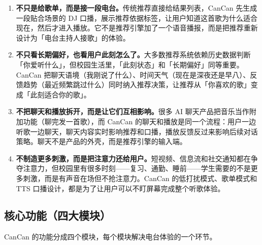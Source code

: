\documentclass[UTF8,a4paper,11pt,fontset=windows]{ctexart}
\begin{document}
\begin{enumerate}
  \item \textbf{不只是给歌单，而是接一段电台。}传统推荐直接给结果列表，CanCan 先生成一段贴合场景的 DJ 口播，展示推荐依据标签，让用户知道这首歌为什么适合现在，然后才进入播放。它不是推荐引擎加了一个语音播报，而是把推荐重新设计为「电台主持人接歌」的体验。
  \item \textbf{不只看长期偏好，也看用户此刻怎么了。}大多数推荐系统依赖历史数据判断「你爱听什么」，但校园生活里，「此刻状态」和「长期偏好」同等重要。CanCan 把聊天语境（我刚说了什么）、时间天气（现在是深夜还是早八）、反馈趋势（最近频繁跳过什么）同时纳入推荐决策，让推荐从「你喜欢的歌」变成「此刻适合你的歌」。
  \item \textbf{不把聊天和播放拆开，而是让它们互相影响。}很多 AI 聊天产品把音乐当作附加功能（聊完发一首歌），而 CanCan 的聊天和播放是同一个流程：用户一边听歌一边聊天，聊天内容实时影响推荐和口播，播放反馈反过来影响后续对话策略。聊天不是产品的外壳，而是推荐引擎的输入端。
  \item \textbf{不制造更多刺激，而是把注意力还给用户。}短视频、信息流和社交通知都在争夺注意力，但校园里有很多时刻——复习、通勤、睡前——学生需要的不是更多刺激，而是有声音在场但不抢注意力。CanCan 的低打扰模式、歌单模式和 TTS 口播设计，都是为了让用户可以不盯屏幕完成整个听歌体验。
\end{enumerate}

\subsection{核心功能（四大模块）}

CanCan 的功能分成四个模块，每个模块解决电台体验的一个环节。
\end{document}
